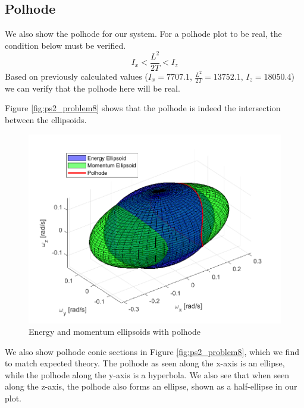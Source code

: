 \subsection{Polhode}
We also show the polhode for our system. For a polhode plot to be real, the condition below must be verified.
\begin{equation*}
    I_x < \frac{L^2}{2T} < I_z
\end{equation*}
Based on previously calculated values ($I_x = 7707.1$, $\frac{L^2}{2T} = 13752.1$, $I_z = 18050.4$) we can verify that the polhode here will be real.

Figure \ref{fig:ps2_problem8} shows that the polhode is indeed the intersection between the ellipsoids.

\begin{figure}[H]
\centering
\includegraphics[scale=0.65]{Images/ps2_problem7.png}
\caption{Energy and momentum ellipsoids with polhode}
\label{fig:ps2_problem7}
\end{figure}

We also show polhode conic sections in Figure \ref{fig:ps2_problem8}, which we find to match expected theory. The polhode as seen along the x-axis is an ellipse, while the polhode along the y-axis is a hyperbola. We also see that when seen along the z-axis, the polhode also forms an ellipse, shown as a half-ellipse in our plot.

